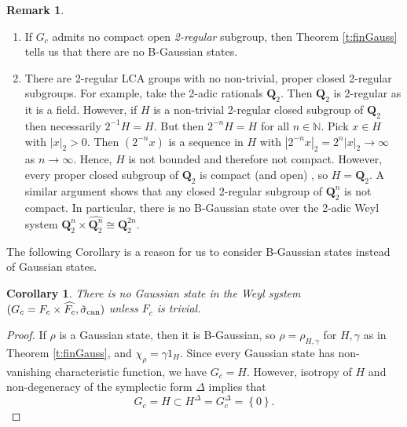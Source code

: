 \documentclass[12pt,reqno]{amsart}
\newtheorem{cor}[thm]{Corollary}
\theoremstyle{definition}
\theoremstyle{definition}
\theoremstyle{definition}
\newtheorem{rem}[thm]{Remark}
\numberwithin{thm}{section}
\numberwithin{equation}{section}
\newcommand{\set}[1]{\left\{#1\right\}}
\newcommand{\tcr}[1]{\textcolor{red}{#1}}
\newcommand{\bN}{\mathbb{N}}
\begin{document}
\begin{rem}\label{rem-2reg}${}$
    \begin{enumerate}
    
        \item If $G_c$ admits no compact open \textit{2-regular} subgroup, then Theorem \ref{t:finGauss} tells us that there are no B-Gaussian states.
        
        \item There are 2-regular LCA groups with no non-trivial, proper closed 2-regular subgroups. For example, take the 2-adic rationals $\mathbf{Q}_2$. Then $\mathbf{Q}_2$ is 2-regular as it is a field. However, if $H$ is a non-trivial 2-regular closed subgroup of $\mathbf{Q}_2$ then necessarily $2^{-1}H=H$. But then $2^{-n}H=H$ for all $n\in\bN$. Pick $x\in H$ with $|x|_2>0$. Then $(2^{-n}x)$ is a sequence in $H$ with $|2^{-n}x|_2=2^n|x|_2\rightarrow\infty$ as $n\rightarrow\infty$. Hence, $H$ is not bounded and therefore not compact. However, every proper closed subgroup of $\mathbf{Q}_2$ is compact (and open) \cite[Corollary 9]{RS}, so $H=\mathbf{Q}_2$. A similar argument shows that any closed 2-regular subgroup of $\mathbf{Q}_2^n$ is not compact. In particular, there is no B-Gaussian state over the 2-adic Weyl system $\mathbf{Q}_2^n\times \widehat{\mathbf{Q}_2^n}\cong \mathbf{Q}_2^{2n}$.
    \end{enumerate}

\end{rem}


The following Corollary is a reason for us to consider B-Gaussian states instead of Gaussian states. 

\begin{cor}\label{t:fin-nongauss} There is no Gaussian state in the Weyl system $(G_c=F_c\times\widehat{F_c}, \tilde{\sigma}_{\rm can})$ unless $F_c$ is trivial. 
\end{cor}
\begin{proof}
If $\rho$ is a Gaussian state, then it is B-Gaussian, so $\rho=\rho_{H,\gamma}$ for $H,\gamma$ as in Theorem \ref{t:finGauss}, and $\chi_{\rho}=\gamma1_H$. Since every Gaussian state has non-vanishing characteristic function, we have $G_c=H$.
However, isotropy of $H$ and non-degeneracy of the symplectic form $\Delta$ implies that
    $$G_c=H\subset H^{\Delta}=G^{\Delta}_c=\set{0}.$$
\end{proof}
\end{document}
